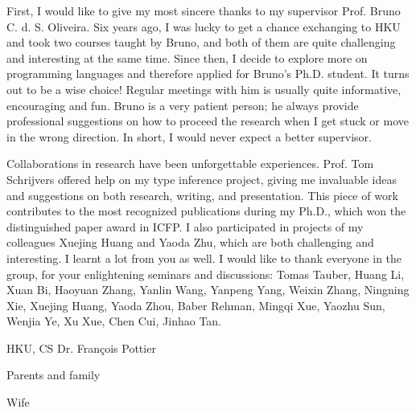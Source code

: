 
First, I would like to give my most sincere thanks to my supervisor Prof. Bruno C. d. S. Oliveira.
Six years ago, I was lucky to get a chance exchanging to HKU and
took two courses taught by Bruno,
and both of them are quite challenging and interesting at the same time.
Since then, I decide to explore more on programming languages and
therefore applied for Bruno's Ph.D. student.
It turns out to be a wise choice!
Regular meetings with him is usually quite informative, encouraging and fun.
Bruno is a very patient person;
he always provide professional suggestions on how to proceed the research when I get stuck or
move in the wrong direction.
In short, I would never expect a better supervisor.

Collaborations in research have been unforgettable experiences.
Prof. Tom Schrijvers offered help on my type inference project,
giving me invaluable ideas and suggestions on both research, writing, and presentation.
This piece of work contributes to the most recognized publications during my Ph.D.,
which won the distinguished paper award in ICFP.
I also participated in projects of my colleagues Xuejing Huang and Yaoda Zhu,
which are both challenging and interesting. I learnt a lot from you as well.
I would like to thank everyone in the group, for your enlightening seminars and discussions:
%
Tomas Tauber, Huang Li, Xuan Bi, Haoyuan Zhang, Yanlin Wang, Yanpeng Yang,
Weixin Zhang, Ningning Xie, 
%
Xuejing Huang, Yaoda Zhou, Baber Rehman, Mingqi Xue, Yaozhu Sun, Wenjia Ye, Xu Xue,
Chen Cui, Jinhao Tan.


HKU, CS
Dr. François Pottier

Parents and family

Wife

